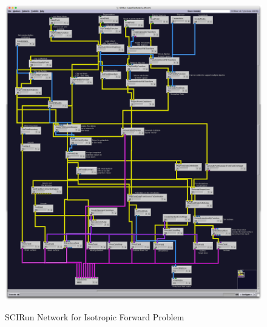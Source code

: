 \begin{figure}[p]
\begin{center}
\includegraphics[width=\textwidth]{Figures/iso_network.png}\\
\caption{SCIRun Network for Isotropic Forward Problem}
\label{fig:isofor}
\end{center}
\end{figure}

